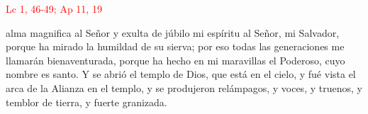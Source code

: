 \hfill\textcolor{red}{Lc 1, 46-49; Ap 11, 19}

alma magnifica al Señor y exulta de júbilo mi espíritu al Señor, mi Salvador, porque ha mirado la humildad de su sierva;
por eso todas las generaciones me llamarán bienaventurada, porque ha hecho en mi maravillas el Poderoso, cuyo nombre es santo. Y se abrió el templo de Dios, que está en el cielo,
y fué vista el arca de la Alianza en el templo, y se produjeron relámpagos, y voces, y truenos, y temblor de tierra, y fuerte granizada.